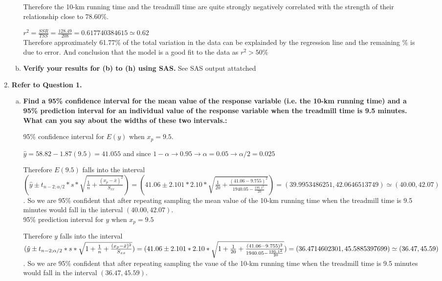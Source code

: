 \documentclass{article}
\begin{document}
\begin{enumerate}[1.]
\begin{enumerate}[(a)]
Therefore the 10-km running time and the treadmill time are quite strongly negatively correlated with the strength of their relationship close to 78.60\%.

$r^2 = \frac{SSR}{TSS} = \frac{128.49}{208} = 0.617740384615 \simeq 0.62$ \\

Therefore approximately 61.77\% of the total variation in the data can be explainded by the regression line and the remaining \% is due to error. And conclusion that the model is a good fit to the data as $r^2 > 50\%$

  \item \textbf{Verify your results for (b) to (h) using SAS.}
See SAS output attatched


\end{enumerate}

\item \textbf{Refer to Question 1.}
\begin{enumerate}[(a)]
\item \textbf{Find a 95\% confidence interval for the mean
value of the response variable (i.e. the 10-km running time) and a 95\% prediction
interval for an individual value of the response variable when the treadmill time is 9.5
minutes. What can you say about the widths of these two intervals.:}


95\% confidence interval for $E(y)$ when $x_p =9.5$. 

$\hat{y} = 58.82 - 1.87(9.5) = 41.055$ and since $1 - \alpha \to 0.95 \to \alpha = 0.05 \to \alpha/2 = 0.025$

Therefore $E(9.5)$ falls into the interval \\
$(\hat{y} \pm t_{n-2;\alpha/2} * s * \sqrt{ \frac{1}{n} + \frac{(x_p - \bar{x})^2}{S_{xx}}}) = (41.06 \pm 2.101 * 2.10 * \sqrt{\frac{1}{20} + \frac{(41.06 - 9.755)^2}{ 1940.05 - \frac{195.1^2}{20}} }) = (39.9953486251, 42.0646513749) \simeq (40.00, 42.07)$. So we are 95\% confident that after repeating sampling the mean value of the 10-km running time when the treadmill time is 9.5 minutes would fall in the interval $(40.00, 42.07)$. \\

95\% prediction interval for $y$ when $x_p = 9.5$

Therefore $y$ falls into the interval \\
$(\hat{y} \pm t_{n-2;\alpha/2} * s * \sqrt{ 1+ \frac{1}{n} + \frac{(x_p - \bar{x})^2}{S_{xx}}}) = (41.06 \pm 2.101 * 2.10 * \sqrt{1 + \frac{1}{20} + \frac{(41.06 - 9.755)^2}{ 1940.05 - \frac{195.1^2}{20}} }) = \\
(36.4714602301, 45.5885397699) \simeq (36.47, 45.59)$. So we are 95\% confident that after repeating sampling the vaue of the 10-km running time when the treadmill time is 9.5 minutes would fall in the interval $(36.47, 45.59)$. \\


\end{enumerate}
\end{enumerate}
\end{document}

